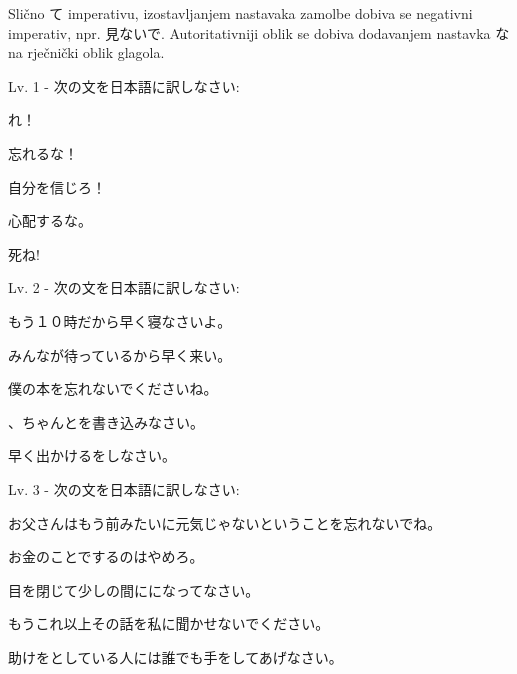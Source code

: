 	Slično て imperativu, izostavljanjem nastavaka zamolbe dobiva se negativni imperativ, npr. 見ないで. Autoritativniji oblik se dobiva dodavanjem nastavka な na rječnički oblik glagola.
	
	\begin{reibun}
	\end{reibun}
	 
	\newpage		

	\begin{mondai}{Lv. 1 - 次の文を日本語に訳しなさい:}
		\item {}れ！
		\item 忘れるな！
		\item 自分を信じろ！
		\item 心配するな。
		\item 死ね!
	\end{mondai}

	\begin{mondai}{Lv. 2 - 次の文を日本語に訳しなさい:}
		\item もう１０時だから早く寝なさいよ。
		\item みんなが待っているから早く来い。
		\item 僕の本を忘れないでくださいね。
		\item {}、ちゃんとを書き込みなさい。
		\item 早く出かけるをしなさい。
	\end{mondai}

	\begin{mondai}{Lv. 3 - 次の文を日本語に訳しなさい:}
		\item お父さんはもう前みたいに元気じゃないということを忘れないでね。
		\item お金のことでするのはやめろ。
		\item 目を閉じて少しの間にになってなさい。
		\item もうこれ以上その話を私に聞かせないでください。
		\item 助けをとしている人には誰でも手をしてあげなさい。
	\end{mondai}

	\newpage		
	
